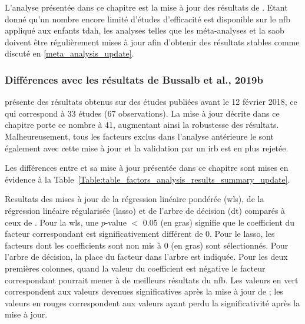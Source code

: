 L'analyse présentée dans ce chapitre est la mise à jour des résultats de \citet{Bussalb2019clinical}. Etant donné qu'un nombre encore limité d'études
d'efficacité est disponible sur le \gls{nfb} appliqué aux enfants \gls{tdah}, les analyses telles que les méta-analyses et la \gls{saob} doivent être régulièrement mises
à jour afin d'obtenir des résultats stables comme discuté en \ref{meta_analysis_update}.

\subsubsection{Différences avec les résultats de Bussalb et al., 2019b}
\citet{Bussalb2019clinical} présente des résultats obtenus sur des études publiées avant le 12 février 2018, ce qui correspond à 33 études (67 observations). La mise 
à jour décrite dans ce chapitre porte ce nombre à 41, augmentant ainsi la robustesse des
résultats. Malheureusement, tous les facteurs exclus dans l'analyse antérieure le sont également avec cette mise à jour et la validation par
un \gls{irb} est en plus rejetée.

Les différences entre \citet{Bussalb2019clinical} et sa mise à jour présentée dans ce chapitre sont mises en évidence à la 
Table~\ref{Table:table_factors_analysis_results_summary_update}.

\begin{table}[h!]
  \centering
  \caption{Resultats des mises à jour de la régression linéaire pondérée (\gls{wls}), de la régression linéaire régularisée (\gls{lasso}) et de l'arbre de décision (\gls{dt})
	comparés à ceux de \citet{Bussalb2019clinical}. Pour la \gls{wls}, une $p$-value $<$ 0.05 
	(en gras) signifie que le coefficient du facteur correspondant est significativement différent de 0. Pour le \gls{lasso}, les facteurs dont les coefficients sont non mis à 0 (en gras) sont 
	sélectionnés. Pour l'arbre de décision, la place du facteur dans l'arbre est indiquée. Pour les deux premières colonnes, quand la valeur du coefficient est négative le facteur 
	correspondant pourrait mener à de meilleurs résultats du \gls{nfb}. Les valeurs en vert correspondent aux valeurs devenues significatives après la mise à jour de \citet{Bussalb2019clinical}; les valeurs
	en rouges correspondent aux valeurs ayant perdu la significativité après la mise à jour.}
  
  \label{Table:table_factors_analysis_results_summary_update}
\end{table}

